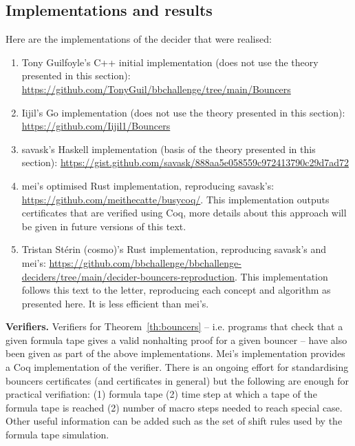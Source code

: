 \subsection{Implementations and results}\label{sec:bouncers-implem}


Here are the implementations of the decider that were realised:

\begin{enumerate}
    \item Tony Guilfoyle's C++ initial implementation (does not use the theory presented in this section): \url{https://github.com/TonyGuil/bbchallenge/tree/main/Bouncers}
    \item Iijil's Go implementation (does not use the theory presented in this section): \url{https://github.com/Iijil1/Bouncers}
    \item savask's Haskell implementation (basis of the theory presented in this section): \url{https://gist.github.com/savask/888aa5e058559c972413790c29d7ad72}
    \item mei's optimised Rust implementation, reproducing savask's: \url{https://github.com/meithecatte/busycoq/}. This implementation outputs certificates that are verified using Coq, more details about this approach will be given in future versions of this text.
    \item Tristan Stérin (cosmo)'s Rust implementation, reproducing savask's and mei's: \url{https://github.com/bbchallenge/bbchallenge-deciders/tree/main/decider-bouncers-reproduction}. This implementation follows this text to the letter, reproducing each concept and algorithm as presented here. It is less efficient than mei's.


\end{enumerate}


\textbf{Verifiers.} Verifiers for Theorem~\ref{th:bouncers} -- i.e. programs that check that a given formula tape gives a valid nonhalting proof for a given bouncer -- have also been given as part of the above implementations. Mei's implementation provides a Coq implementation of the verifier. There is an ongoing effort for standardising bouncers certificates (and certificates in general) but the following are enough for practical verifiation: (1) formula tape (2) time step at which a tape of the formula tape is reached (2) number of macro steps needed to reach special case. Other useful information can be added such as the set of shift rules used by the formula tape simulation.


